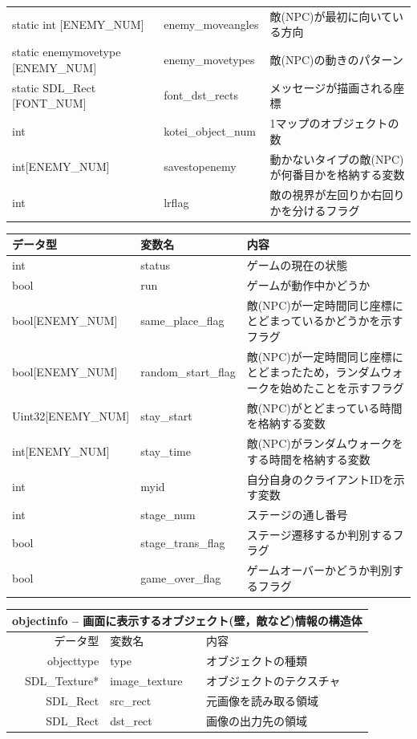 \documentclass{jarticle}
\begin{document}
\begin{table}[H]
\begin{tabular}{|p{13em}|p{13em}|p{12em}|}
    static int [ENEMY\_NUM] & enemy\_moveangles & 敵(NPC)が最初に向いている方向 \\
    static enemymovetype [ENEMY\_NUM] & enemy\_movetypes & 敵(NPC)の動きのパターン \\ 
    static SDL\_Rect [FONT\_NUM] & font\_dst\_rects & メッセージが描画される座標 \\
    int & kotei\_object\_num & 1マップのオブジェクトの数 \\
    int[ENEMY\_NUM] & savestopenemy & 動かないタイプの敵(NPC)が何番目かを格納する変数\\
    int & lrflag & 敵の視界が左回りか右回りかを分けるフラグ \\ \hline
  \end{tabular}
\end{table}

\begin{table}[H]
\begin{tabular}{|p{13em}|p{13em}|p{12em}|}
    \hline
    データ型 & 変数名 & 内容 \\ \hline
    int & status & ゲームの現在の状態 \\
    bool & run & ゲームが動作中かどうか \\
    bool[ENEMY\_NUM] & same\_place\_flag & 敵(NPC)が一定時間同じ座標にとどまっているかどうかを示すフラグ \\
    bool[ENEMY\_NUM] & random\_start\_flag & 敵(NPC)が一定時間同じ座標にとどまったため，ランダムウォークを始めたことを示すフラグ \\
    Uint32[ENEMY\_NUM] & stay\_start & 敵(NPC)がとどまっている時間を格納する変数 \\ 
    int[ENEMY\_NUM] & stay\_time & 敵(NPC)がランダムウォークをする時間を格納する変数\\
    int & myid & 自分自身のクライアントIDを示す変数 \\
    int & stage\_num & ステージの通し番号 \\
    bool & stage\_trans\_flag & ステージ遷移するか判別するフラグ \\
    bool & game\_over\_flag & ゲームオーバーかどうか判別するフラグ \\ \hline
  \end{tabular}
\end{table}

\begin{table}[H]
\begin{tabular}{|r|l|l|}
\hline
\multicolumn{3}{|l|}{objectinfo -- 画面に表示するオブジェクト(壁，敵など)情報の構造体}       \\ \hline
データ型      & 変数名    & 内容        \\ \hline
objecttype    & type & オブジェクトの種類  \\
SDL\_Texture* & image\_texture     & オブジェクトのテクスチャ \\
SDL\_Rect & src\_rect & 元画像を読み取る領域 \\
SDL\_Rect & dst\_rect & 画像の出力先の領域 \\ \hline
\end{tabular}
\end{table}
\end{document}
